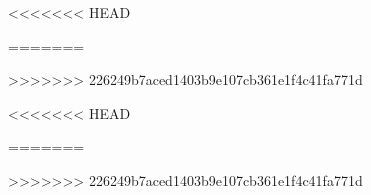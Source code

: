 \usepackage[T1]{fontenc}
\usepackage{amssymb,amsmath}
\usepackage{txfonts}
\usepackage{microtype}
\usepackage{amssymb,amsmath}
\usepackage{graphicx}
<<<<<<< HEAD
\usepackage{subcaption} 

\usepackage{caption}
=======
\usepackage{subfig} 
>>>>>>> 226249b7aced1403b9e107cb361e1f4c41fa771d
\usepackage{natbib}
\usepackage{paralist}
\usepackage{hyperref}
\usepackage{url}
\usepackage{color}
\usepackage{fancyvrb}
\usepackage[a4paper,body={170mm,250mm},top=25mm,left=25mm,head=14pt]{geometry}
<<<<<<< HEAD
\usepackage[sf,bf,small]{titlesec}
\usepackage{fancyhdr}
\usepackage{todonotes}
=======
\usepackage{fancyhdr}
\usepackage{xspace}
\xspaceaddexceptions{\%}
>>>>>>> 226249b7aced1403b9e107cb361e1f4c41fa771d
